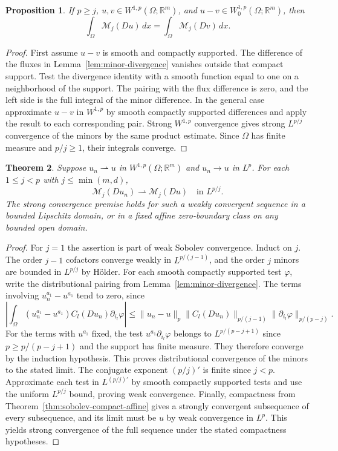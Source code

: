 \documentclass[11pt,oneside,openany]{book}
\newcommand{\R}{\mathbb R}
\newcommand{\norm}[1]{\lVert #1\rVert}
\theoremstyle{plain}
\newtheorem{theorem}{Theorem}[chapter]
\newtheorem{proposition}[theorem]{Proposition}
\theoremstyle{definition}
\theoremstyle{remark}
\begin{document}
\begin{proposition}\label{prop:fixed-trace-minors}
If \(p\ge j\), \(u,v\in W^{1,p}(\Omega;\R^m)\), and
\(u-v\in W^{1,p}_0(\Omega;\R^m)\), then
\[
 \int_\Omega \mathcal M_j(Du)\,dx
 =\int_\Omega \mathcal M_j(Dv)\,dx .
\]
\end{proposition}

\begin{proof}
First assume \(u-v\) is smooth and compactly supported. The
difference of the fluxes in Lemma~\ref{lem:minor-divergence}
vanishes outside that compact support. Test the divergence
identity with a smooth function equal to one on a neighborhood
of the support. The pairing with the flux difference is zero,
and the left side is the full integral of the minor difference.
In the general case approximate \(u-v\) in \(W^{1,p}\) by
smooth compactly supported differences and apply the result to
each corresponding pair. Strong \(W^{1,p}\) convergence gives
strong \(L^{p/j}\) convergence of the minors by the same product
estimate. Since \(\Omega\) has finite measure and \(p/j\ge1\),
their integrals converge.
\end{proof}

\begin{theorem}\label{thm:weak-minors}
Suppose \(u_n\rightharpoonup u\) in \(W^{1,p}(\Omega;\R^m)\)
and \(u_n\to u\) in \(L^p\). For each \(1\le j<p\) with
\(j\le\min(m,d)\),
\[
 \mathcal M_j(Du_n)\rightharpoonup\mathcal M_j(Du)
 \quad\text{in }L^{p/j}.
\]
The strong convergence premise holds for such a weakly
convergent sequence in a bounded Lipschitz domain, or in a
fixed affine zero-boundary class on any bounded open domain.
\end{theorem}

\begin{proof}
For \(j=1\) the assertion is part of weak Sobolev convergence.
Induct on \(j\). The order \(j-1\) cofactors converge weakly in
\(L^{p/(j-1)}\), and the order \(j\) minors are bounded in
\(L^{p/j}\) by H\"older. For each smooth compactly supported
test \(\varphi\), write the distributional pairing from
Lemma~\ref{lem:minor-divergence}. The terms involving
\(u_n^{a_1}-u^{a_1}\) tend to zero, since
\[
 \left|\int_\Omega (u_n^{a_1}-u^{a_1})C_l(Du_n)
                              \partial_{i_l}\varphi\right|
 \le \norm{u_n-u}_p\norm{C_l(Du_n)}_{p/(j-1)}
                        \norm{\partial_{i_l}\varphi}_{p/(p-j)} .
\]
For the terms with \(u^{a_1}\) fixed, the test
\(u^{a_1}\partial_{i_l}\varphi\) belongs to
\(L^{p/(p-j+1)}\) since \(p\ge p/(p-j+1)\) and the support has
finite measure. They therefore converge by the induction
hypothesis. This proves distributional convergence of the
minors to the stated limit. The conjugate exponent
\((p/j)'\) is finite since \(j<p\). Approximate each test
in \(L^{(p/j)'}\) by smooth compactly supported tests and use
the uniform \(L^{p/j}\) bound, proving weak convergence.
Finally, compactness from Theorem~\ref{thm:sobolev-compact-affine}
gives a strongly convergent subsequence of every subsequence,
and its limit must be \(u\) by weak convergence in \(L^p\).
This yields strong convergence of the full sequence under
the stated compactness hypotheses.
\end{proof}
\end{document}
